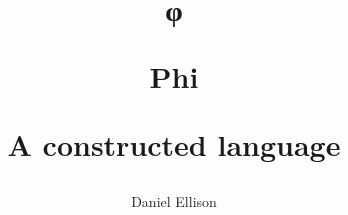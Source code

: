 \title
{
  \logofont \hspace{-0.085em} φ
  \setlength{\parskip}{0.4em}

  \titlefont Phi
  \setlength{\parskip}{0.1em}

  \subtitlefont A constructed language
}
\author{Daniel Ellison}
\date{\DTMnow}
\maketitle
